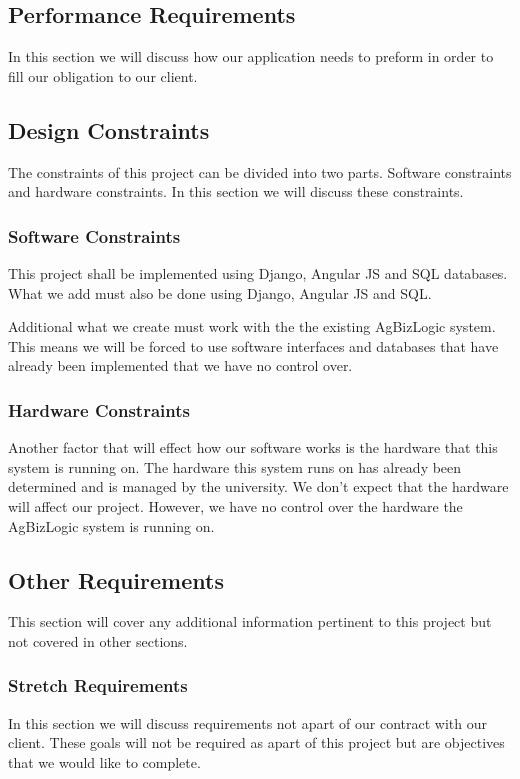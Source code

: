 \documentclass[onecolumn, draftclsnofoot,10pt, compsoc]{article}
\begin{document}
    \subsection{Performance Requirements}
				In this section we will discuss how our application needs to preform in order to fill our obligation to our client.\newline

    \subsection{Design Constraints}
			The constraints of this project can be divided into two parts. Software constraints and hardware constraints. In this section we will discuss these constraints.\newline
			\subsubsection{Software Constraints}
				This project shall be implemented using Django, Angular JS and SQL databases. What we add must also be done using Django, Angular JS and SQL.\newline
				
				Additional what we create must work with the the existing AgBizLogic system. This means we will be forced to use software interfaces and databases that have already been implemented that we have no control over.\\ 
			
			\subsubsection{Hardware Constraints}
				Another factor that will effect how our software works is the hardware that this system is running on. The hardware this system runs on has already been determined and is managed by the university. We don't expect that the hardware will affect our project. However, we have no control over the hardware the AgBizLogic system is running on.\\
				
    \subsection{Other Requirements}
				This section will cover any additional information pertinent to this project but not covered in other sections.\\
				\subsubsection{Stretch Requirements}
				In this section we will discuss requirements not apart of our contract with our client. These goals will not be required as apart of this project but are objectives that we would like to complete.\\
\end{document}
